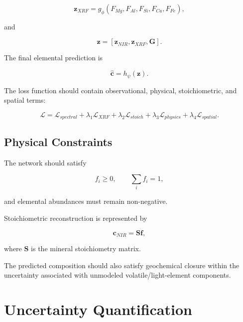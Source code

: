 \documentclass[11pt,a4paper]{article}
\begin{document}
\begin{equation}
\mathbf{z}_{XRF}
=
g_\phi(F_{Mg},F_{Al},F_{Si},F_{Ca},F_{Fe}),
\end{equation}

and

\begin{equation}
\mathbf{z}
=
[
\mathbf{z}_{NIR},
\mathbf{z}_{XRF},
\mathbf{G}
].
\end{equation}

The final elemental prediction is

\begin{equation}
\hat{\mathbf{c}}
=
h_\psi(\mathbf{z}).
\end{equation}

The loss function should contain observational, physical, stoichiometric, and spatial terms:

\begin{equation}
\mathcal{L}
=
\mathcal{L}_{spectral}
+
\lambda_1\mathcal{L}_{XRF}
+
\lambda_2\mathcal{L}_{stoich}
+
\lambda_3\mathcal{L}_{physics}
+
\lambda_4\mathcal{L}_{spatial}.
\end{equation}

\subsection{Physical Constraints}

The network should satisfy

\begin{equation}
f_i\geq0,
\qquad
\sum_i f_i=1,
\end{equation}

and elemental abundances must remain non-negative.

Stoichiometric reconstruction is represented by

\begin{equation}
\mathbf{c}_{NIR}
=
\mathbf{S}\mathbf{f},
\end{equation}

where $\mathbf{S}$ is the mineral stoichiometry matrix.

The predicted composition should also satisfy geochemical closure within the uncertainty associated with unmodeled volatile/light-element components.

\section{Uncertainty Quantification}
\end{document}
